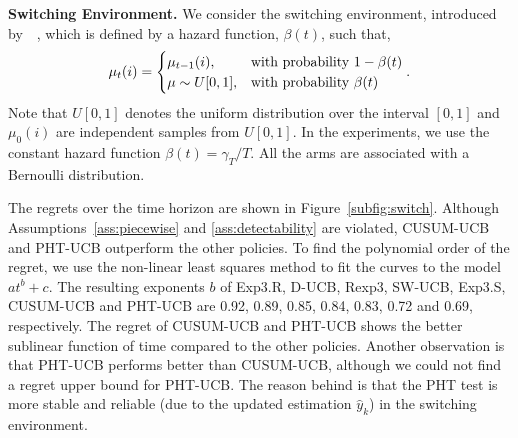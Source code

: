 \documentclass[letterpaper]{article} %
\newcommand{\blue}{}
\begin{document}
{\bf Switching Environment.}
We consider the switching environment, introduced by~\citeauthor{mellor2013thompson}~, which is defined by a hazard function, $\beta(t)$, such that,
\begin{eqnarray}\label{eqn:switch}
\mu_t(i)=
\begin{cases}
\mu_{t-1}(i), &\text{with probability } 1-\beta(t)\cr
\mu\sim U[0,1], &\text{with probability } \beta(t)
\end{cases}.
\end{eqnarray}
Note that $U[0,1]$ denotes the uniform distribution over the interval $[0,1]$ and $\mu_0(i)$ are independent samples from $U[0,1]$. In the experiments, we use the constant hazard function $\beta(t)=\gamma_T/T$. All the arms are associated with a Bernoulli distribution.

The regrets over the time horizon are shown in
Figure~\ref{subfig:switch}.  Although
Assumptions~\ref{ass:piecewise} and \ref{ass:detectability} are violated, CUSUM-UCB and PHT-UCB outperform the other policies. 
{\blue To find the polynomial order of the regret,
we use the non-linear least squares method to fit the curves to the
model $at^b+c$. The
resulting exponents $b$ of Exp3.R, D-UCB, Rexp3, SW-UCB, Exp3.S, CUSUM-UCB and PHT-UCB are
0.92, 0.89, 0.85, 0.84, 0.83, 0.72 and 0.69, respectively.} 
The regret of CUSUM-UCB and PHT-UCB shows the better sublinear
function of time compared to the other policies. Another
observation is that PHT-UCB performs better than CUSUM-UCB,
{\blue although we could not find a regret upper bound for
PHT-UCB}. The reason behind is that the PHT test is more stable and
reliable (due to the updated estimation $\hat{y}_k$) in the switching
environment.

\end{document}
